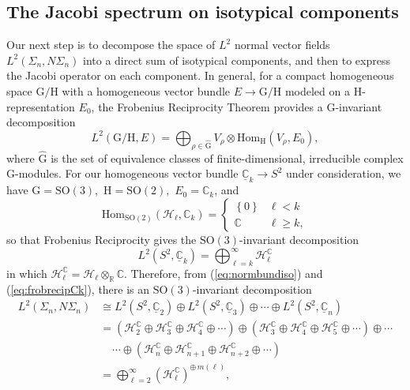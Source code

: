 \documentclass[11pt]{article}
\newcommand{\SO}{\mathrm{SO}}
\newcommand{\G}{\mathrm{G}}
\newcommand{\R}{\mathbb{R}}
\newcommand{\C}{\mathbb{C}}
\newcommand{\Hc}{\mathcal{H}}
\newcommand{\uC}{\underline{\mathbb{C}}}
\theoremstyle{definition}
\numberwithin{equation}{section}
\begin{document}
\subsection{The Jacobi spectrum on isotypical components}

\indent \indent Our next step is to decompose the space of $L^2$ normal vector fields $L^2(\Sigma_n, N\Sigma_n)$ into a direct sum of isotypical components, and then to express the Jacobi operator on each component.  In general, for a compact homogeneous space $\G / \mathrm{H}$ with a homogeneous vector bundle $E \to \G / \mathrm{H}$ modeled on a $\mathrm{H}$-representation $E_0$, the Frobenius Reciprocity Theorem provides a $\G$-invariant decomposition
\begin{equation*}
    L^2(\G / \mathrm{H}, E) = \bigoplus_{\rho \in \widehat{\G}} V_{\rho} \otimes \mathrm{Hom}_{\mathrm{H}} (V_{\rho}, E_0),
\end{equation*}
where $\widehat{\G}$ is the set of equivalence classes of finite-dimensional, irreducible complex $\G$-modules.  For our homogeneous vector bundle $\uC_k \to S^2$ under consideration, we have $\G = \SO(3),$ $\mathrm{H} = \SO(2),$ $E_0 = \C_k$, and
\begin{equation*}
    \mathrm{Hom}_{\SO(2)} ( \Hc_\ell, \C_k) = \begin{cases}
        \left\lbrace 0 \right\rbrace & \ell < k \\
        \C & \ell \geq k,
    \end{cases}
\end{equation*}
so that Frobenius Reciprocity gives the $\SO(3)$-invariant decomposition
\begin{equation}\label{eq:frobrecipCk}
    L^2(S^2, \uC_k) = \bigoplus_{\ell = k}^\infty \Hc_\ell^\C
\end{equation}
in which $\Hc_\ell^\C = \Hc_\ell \otimes_{\R} \C$. Therefore, from (\ref{eq:normbundiso}) and (\ref{eq:frobrecipCk}), there is an $\SO(3)$-invariant decomposition
\begin{equation} \label{eq:Isotypical}
\begin{aligned}
    L^2(\Sigma_n, N \Sigma_n) & \cong L^2(S^2, \uC_2) \oplus L^2(S^2, \uC_3) \oplus \cdots \oplus L^2(S^2, \uC_n) \\
    & = \left( \Hc_2^\C \oplus \Hc_3^\C \oplus \Hc_4^\C \oplus \cdots \right) \oplus \left( \Hc_3^\C \oplus \Hc_4^\C \oplus \Hc_5^\C \oplus \cdots \right) \oplus \cdots \\
    & \ \ \ \ \ \cdots \oplus \left( \Hc_n^\C \oplus \Hc_{n+1}^\C \oplus \Hc_{n+2}^\C \oplus \cdots \right) \\
    & = \bigoplus_{\ell = 2}^\infty \left(\Hc_\ell^\C\right) ^{\oplus\, m(\ell)},
 \end{aligned}
\end{equation}
\end{document}
